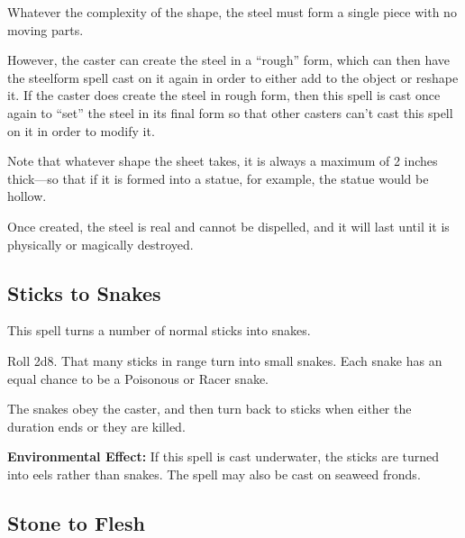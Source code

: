\begin{multicols*}{2}
Whatever the complexity of the shape, the steel must form a single piece with no moving parts.

However, the caster can create the steel in a “rough” form, which can then have the steelform spell cast on it again in order to either add to the object or reshape it. If the caster does create the steel in rough form, then this spell is cast once again to “set” the steel in its final form so that other casters can’t cast this spell on it in order to modify it.

Note that whatever shape the sheet takes, it is always a maximum of 2 inches thick—so that if it is formed into a statue, for example, the statue would be hollow.

Once created, the steel is real and cannot be dispelled, and it will last until it is physically or magically destroyed.

\subsection{Sticks to Snakes}\label{spell:Sticks to Snakes}

This spell turns a number of normal sticks into snakes.

Roll 2d8. That many sticks in range turn into small snakes. Each snake has an equal chance to be a Poisonous or Racer snake.

The snakes obey the caster, and then turn back to sticks when either the duration ends or they are killed.

\textbf{Environmental Effect:} If this spell is cast underwater, the sticks are turned into eels rather than snakes. The spell may also be cast on seaweed fronds.

\subsection{Stone to Flesh}\label{spell:Stone to Flesh}


\end{multicols*}
